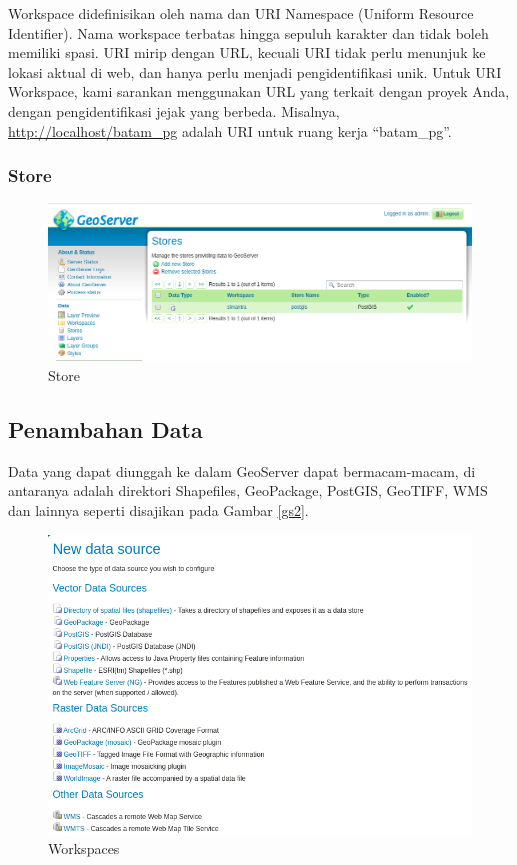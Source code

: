 \documentclass[]{book}
\begin{document}
Workspace didefinisikan oleh nama dan URI Namespace (Uniform Resource Identifier). Nama workspace terbatas hingga sepuluh karakter dan tidak boleh memiliki spasi. URI mirip dengan URL, kecuali URI tidak perlu menunjuk ke lokasi aktual di web, dan hanya perlu menjadi pengidentifikasi unik. Untuk URI Workspace, kami sarankan menggunakan URL yang terkait dengan proyek Anda, dengan pengidentifikasi jejak yang berbeda. Misalnya, \url{http://localhost/batam_pg} adalah URI untuk ruang kerja ``batam\_pg''.

\hypertarget{store}{%
\subsubsection{Store}\label{store}}

\begin{figure}

{\centering \includegraphics[width=0.6\linewidth]{images/08/gs8} 

}

\caption{Store}\label{fig:gs8}
\end{figure}

\hypertarget{penambahan-data}{%
\subsection{Penambahan Data}\label{penambahan-data}}

Data yang dapat diunggah ke dalam GeoServer dapat bermacam-macam, di antaranya adalah direktori Shapefiles, GeoPackage, PostGIS, GeoTIFF, WMS dan lainnya seperti disajikan pada Gambar \ref{gs2}.

\begin{figure}

{\centering \includegraphics[width=0.6\linewidth]{images/08/gs2} 

}

\caption{Workspaces}\label{fig:gs2}
\end{figure}
\end{document}
